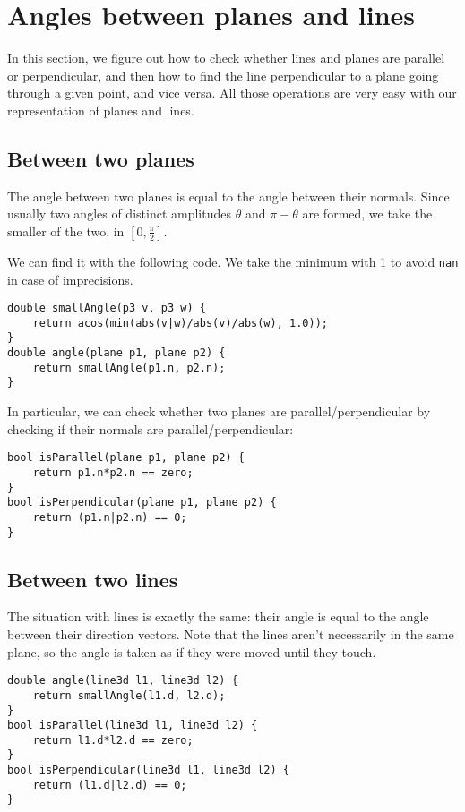 \section{Angles between planes and lines}\label{s:angles}
In this section, we figure out how to check whether lines and planes are parallel or perpendicular, and then how to find the line perpendicular to a plane going through a given point, and vice versa. All those operations are very easy with our representation of planes and lines.

\subsection{Between two planes}
The angle between two planes is equal to the angle between their normals. Since usually two angles of distinct amplitudes $\theta$ and $\pi-\theta$ are formed, we take the smaller of the two, in $[0,\frac{\pi}{2}]$.


We can find it with the following code. We take the minimum with 1 to avoid \lstinline|nan| in case of imprecisions.
\begin{lstlisting}
double smallAngle(p3 v, p3 w) {
    return acos(min(abs(v|w)/abs(v)/abs(w), 1.0));
}
double angle(plane p1, plane p2) {
    return smallAngle(p1.n, p2.n);
}
\end{lstlisting}

In particular, we can check whether two planes are parallel/perpendicular by checking if their normals are parallel/perpendicular:
\begin{lstlisting}
bool isParallel(plane p1, plane p2) {
    return p1.n*p2.n == zero;
}
bool isPerpendicular(plane p1, plane p2) {
    return (p1.n|p2.n) == 0;
}
\end{lstlisting}

\subsection{Between two lines}
The situation with lines is exactly the same: their angle is equal to the angle between their direction vectors. Note that the lines aren't necessarily in the same plane, so the angle is taken as if they were moved until they touch.


\begin{lstlisting}
double angle(line3d l1, line3d l2) {
    return smallAngle(l1.d, l2.d);
}
bool isParallel(line3d l1, line3d l2) {
    return l1.d*l2.d == zero;
}
bool isPerpendicular(line3d l1, line3d l2) {
    return (l1.d|l2.d) == 0;
}
\end{lstlisting}

